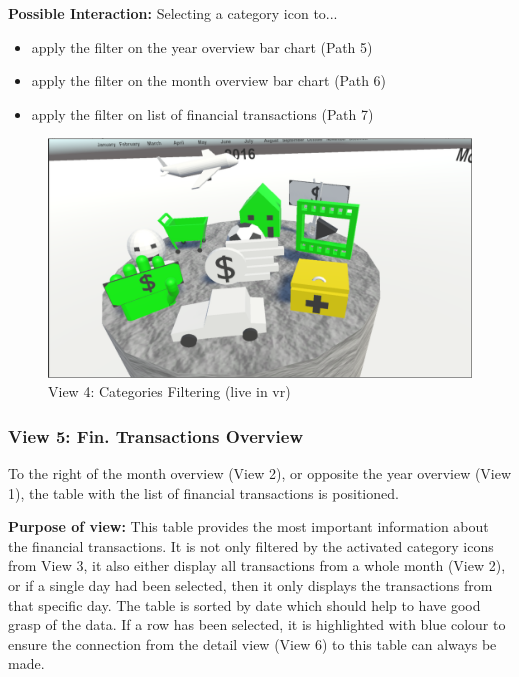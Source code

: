\textbf{Possible Interaction:} Selecting a category icon to...
\begin{itemize}[noitemsep,nolistsep]
	\item apply the filter on the year overview bar chart (Path 5)
	\item apply the filter on the month overview bar chart (Path 6)
	\item apply the filter on list of financial transactions (Path 7)
\end{itemize}

\begin{figure}[h]
	\begin{center}
		\includegraphics[width=12cm]{03_Figures/08_Development/View4_CategoriesFiltering_Loading.png}
		\caption{View 4: Categories Filtering (live in \gls{vr})}
		\label{fig:unityview4}
	\end{center}
\end{figure}


\subsubsection{View 5: Fin. Transactions Overview}

To the right of the month overview (View 2), or opposite the year overview (View 1), the table with the list of financial transactions is positioned.

\textbf{Purpose of view:} This table provides the most important information about the financial transactions. It is not only filtered by the activated category icons from View 3, it also either display all transactions from a whole month (View 2), or if a single day had been selected, then it only displays the transactions from that specific day. The table is sorted by date which should help to have good grasp of the data. If a row has been selected, it is highlighted with blue colour to ensure the connection from the detail view (View 6) to this table can always be made.

